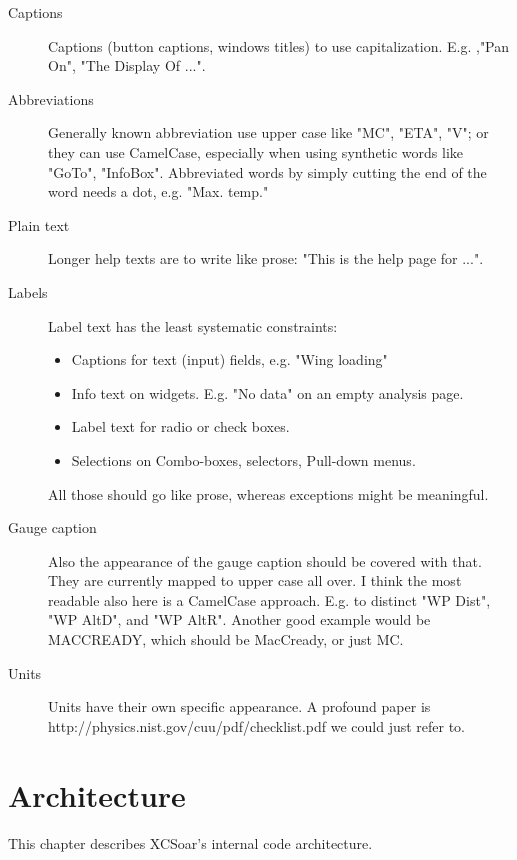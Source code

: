 \documentclass[a4paper,12pt]{refrep}
\begin{document}
\begin{description}
  \item[Captions] Captions (button captions, windows titles) to use
        capitalization. E.g. ,"Pan On", "The Display Of ...". 

  \item[Abbreviations] Generally known abbreviation use upper case like "MC", "ETA",
        "V"; or they can use CamelCase, especially when using synthetic
        words  like "GoTo", "InfoBox". 
        Abbreviated words by simply cutting the end of the word needs a
        dot, e.g. "Max. temp."

  \item[Plain text] Longer help texts are to write like prose: "This is the help
        page for ...".

  \item[Labels] Label text has the least systematic constraints:
\begin{itemize}
    \item Captions for text (input) fields, e.g. "Wing loading"
    \item Info text on widgets. E.g. "No data" on an empty
          analysis page. 
    \item Label text for radio or check boxes. 
    \item Selections on Combo-boxes, selectors, Pull-down menus. 
\end{itemize}
  All those should go like prose, whereas exceptions might be
  meaningful.
  
  \item[Gauge caption] Also the appearance of the gauge caption should be covered with
        that. They are currently mapped to upper case all over. I think
        the most readable also here is a CamelCase approach. E.g. to
        distinct "WP Dist", "WP AltD", and "WP AltR". Another good
        example would be MACCREADY, which should be MacCready, or just
        MC.

  \item[Units] Units have their own specific appearance. A profound paper is
        http://physics.nist.gov/cuu/pdf/checklist.pdf we could just
        refer to.
\end{description}


\chapter{Architecture}

This chapter describes XCSoar's internal code architecture.
\end{document}
